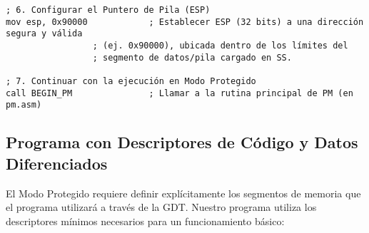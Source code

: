 \begin{lstlisting}[style=NasmStyle,
    caption={\texttt{switch\_to\_pm.asm} (Núcleo de la transición)}]
; 6. Configurar el Puntero de Pila (ESP)
mov esp, 0x90000            ; Establecer ESP (32 bits) a una dirección segura y válida
                 ; (ej. 0x90000), ubicada dentro de los límites del
                 ; segmento de datos/pila cargado en SS.

; 7. Continuar con la ejecución en Modo Protegido
call BEGIN_PM               ; Llamar a la rutina principal de PM (en pm.asm)
\end{lstlisting}

\subsection{Programa con Descriptores de Código y Datos Diferenciados}

El Modo Protegido requiere definir explícitamente los segmentos de memoria que el programa utilizará a través de la GDT. Nuestro programa utiliza los descriptores mínimos necesarios para un funcionamiento básico:

